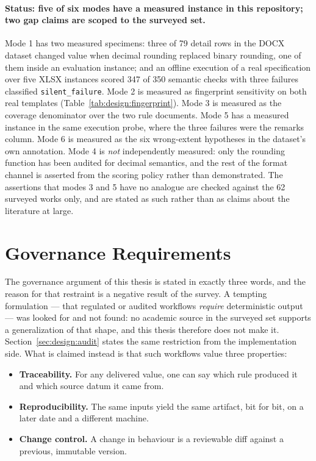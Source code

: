 \paragraph{Status: five of six modes have a measured instance in this repository; two gap
claims are scoped to the surveyed set.}
Mode 1 has two measured specimens: three of 79 detail rows in the DOCX dataset changed value
when decimal rounding replaced binary rounding, one of them inside an evaluation instance; and
an offline execution of a real specification over five XLSX instances scored 347 of 350
semantic checks with three failures classified \texttt{silent\_failure}. Mode 2 is measured as
fingerprint sensitivity on both real templates (Table~\ref{tab:design:fingerprint}). Mode 3 is
measured as the coverage denominator over the two rule documents. Mode 5 has a measured
instance in the same execution probe, where the three failures were the remarks column. Mode 6
is measured as the six wrong-extent hypotheses in the dataset's own annotation. Mode 4 is
\emph{not} independently measured: only the rounding function has been audited for decimal
semantics, and the rest of the format channel is asserted from the scoring policy rather than
demonstrated. The assertions that modes 3 and 5 have no analogue are checked against the 62
surveyed works only, and are stated as such rather than as claims about the literature at
large.

\section{Governance Requirements}
\label{sec:rel:governance}

The governance argument of this thesis is stated in exactly three words, and the reason for
that restraint is a negative result of the survey. A tempting formulation --- that regulated or
audited workflows \emph{require} deterministic output --- was looked for and not found: no
academic source in the surveyed set supports a generalization of that shape, and this thesis
therefore does not make it. Section~\ref{sec:design:audit} states the same restriction from the
implementation side. What is claimed instead is that such workflows value three properties:

\begin{itemize}
  \item \textbf{Traceability.} For any delivered value, one can say which rule produced it and
    which source datum it came from.
  \item \textbf{Reproducibility.} The same inputs yield the same artifact, bit for bit, on a
    later date and a different machine.
  \item \textbf{Change control.} A change in behaviour is a reviewable diff against a
    previous, immutable version.
\end{itemize}

